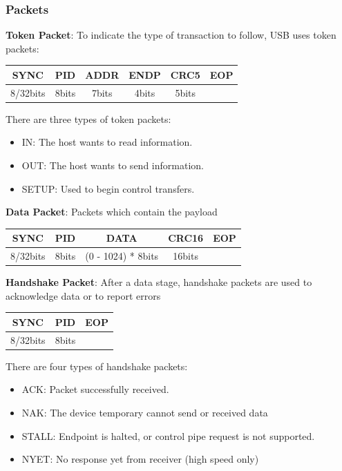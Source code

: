 \documentclass[pdftex,10pt,a4paper]{report}
\newenvironment{packed_item}{
\begin{itemize}
  \setlength{\itemsep}{1pt}
  \setlength{\parskip}{0pt}
  \setlength{\parsep}{0pt}
}{\end{itemize}}
\begin{document}
\subsubsection{Packets}
\begin{packed_item}
	\item \textbf{Token Packet}: To indicate the type of transaction to follow, USB uses token packets:
		\begin{center}
		\begin{tabular}{|c|c|c|c|c|c|}
  	\hline
  		SYNC & PID & ADDR & ENDP & CRC5 & EOP \\ \hline
  		8/32bits & 8bits & 7bits & 4bits & 5bits &  \\
  	\hline
  	\end{tabular}
  	\end{center}
  	
  	There are three types of token packets: 
  	\begin{itemize} \itemsep 0em
			\item IN: The host wants to read information.
			\item OUT: The host wants to send information.
			\item SETUP: Used to begin control transfers.
  	\end{itemize}
  	
  	
	\item \textbf{Data Packet}: Packets which contain the payload
		\begin{center}
		\begin{tabular}{|c|c|c|c|c|}
  	\hline
  		SYNC & PID & DATA & CRC16 & EOP \\ \hline
  		8/32bits & 8bits & (0 - 1024) * 8bits & 16bits &   \\
  	\hline
  	\end{tabular}
  	\end{center}
  	
  	
	\item \textbf{Handshake Packet}: After a data stage, handshake packets are used to acknowledge data or to report errors
		\begin{center}
		\begin{tabular}{|c|c|c|}
  	\hline
  		SYNC & PID & EOP \\ \hline
  		8/32bits & 8bits &  \\
  	\hline
  	\end{tabular}
  	\end{center}
  	
  	There are four types of handshake packets:
  	\begin{itemize} \itemsep 0em
			\item ACK: Packet successfully received.
			\item NAK: The device temporary cannot send or received data
			\item STALL: Endpoint is halted, or control pipe request is not supported.
			\item NYET: No response yet from receiver (high speed only)
  	\end{itemize}
  	

\end{packed_item}
\end{document}
